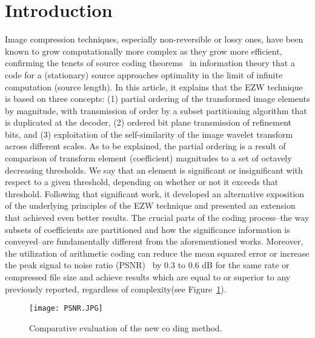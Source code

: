 \documentclass[10pt,twocolumn,letterpaper]{article}
\begin{document}
\section{Introduction}
Image compression techniques, especially non-reversible or lossy ones, have been known to grow computationally more complex as they grow more efficient, confirming the tenets of source coding theorems~\cite{Gray2003Process} in information theory that a code for a (stationary) source approaches optimality in the limit of infinite computation (source length). In this article, it explains that the EZW technique is based on three concepts: (1) partial ordering of the transformed image elements by magnitude, with transmission of order by a subset partitioning algorithm that is duplicated at the decoder, (2) ordered bit plane transmission of refinement bits, and (3) exploitation of the self-similarity of the image wavelet transform across different scales. As to be explained, the partial ordering is a result of comparison of transform element (coefficient) magnitudes to a set of octavely decreasing thresholds. We say that an element is significant or insignificant with respect to a given threshold, depending on whether or not it exceeds that threshold. Following that significant work, it developed an alternative exposition of the underlying principles of the EZW technique and presented an extension that achieved even better results. The crucial parts of the coding process--the way subsets of coefficients are partitioned and how the significance information is conveyed--are fundamentally different from the aforementioned works. Moreover, the utilization of arithmetic coding can reduce the mean squared error or increase the peak signal to noise ratio (PSNR)~\cite{Grandy2012An} by 0.3 to 0.6 dB for the same rate or compressed file size and achieve results which are equal to or superior to any previously reported, regardless of complexity(see Figure~\ref{fig:onecol}).
\begin{figure}[htbp]
\begin{center}
\texttt{[image: PSNR.JPG]}
\end{center}
 \caption{Comparative evaluation of the new co ding method.}
\label{fig:long}
\label{fig:onecol}
\end{figure}
\end{document}
